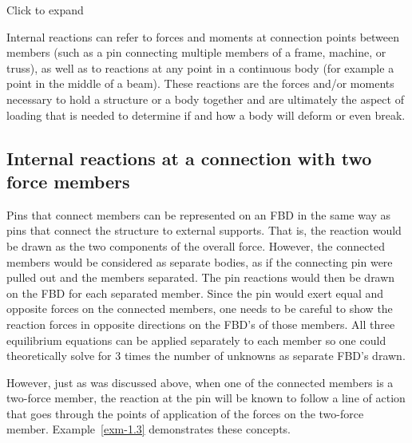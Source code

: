 \documentclass[
  letterpaper,
  DIV=11,
  numbers=noendperiod]{scrreprt}
\theoremstyle{definition}
\theoremstyle{remark}
\begin{document}
Click to expand

Internal reactions can refer to forces and moments at connection points
between members (such as a pin connecting multiple members of a frame,
machine, or truss), as well as to reactions at any point in a continuous
body (for example a point in the middle of a beam). These reactions are
the forces and/or moments necessary to hold a structure or a body
together and are ultimately the aspect of loading that is needed to
determine if and how a body will deform or even break.

\subsection{Internal reactions at a connection with two force
members}\label{internal-reactions-at-a-connection-with-two-force-members}

Pins that connect members can be represented on an FBD in the same way
as pins that connect the structure to external supports. That is, the
reaction would be drawn as the two components of the overall force.
However, the connected members would be considered as separate bodies,
as if the connecting pin were pulled out and the members separated. The
pin reactions would then be drawn on the FBD for each separated member.
Since the pin would exert equal and opposite forces on the connected
members, one needs to be careful to show the reaction forces in opposite
directions on the FBD's of those members. All three equilibrium
equations can be applied separately to each member so one could
theoretically solve for 3 times the number of unknowns as separate FBD's
drawn.

However, just as was discussed above, when one of the connected members
is a two-force member, the reaction at the pin will be known to follow a
line of action that goes through the points of application of the forces
on the two-force member. Example~\ref{exm-1.3} demonstrates these
concepts.
\end{document}
